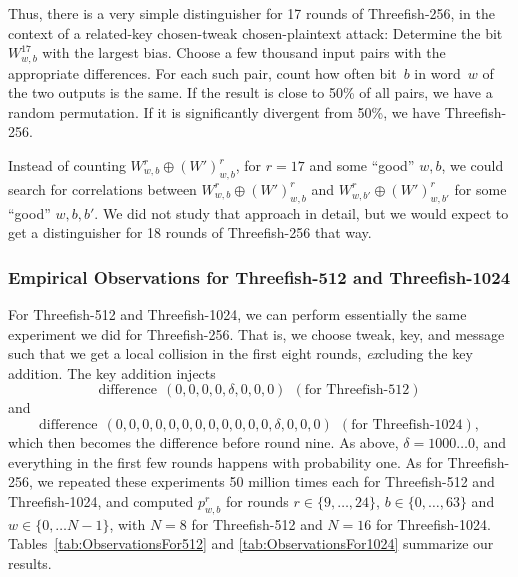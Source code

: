 \documentclass[11pt,twoside]{article}
\begin{document}
Thus, there is a very simple distinguisher for 17 rounds of Threefish-256, in the context of a related-key chosen-tweak chosen-plaintext attack: Determine the bit $W^{17}_{w,b}$ with the largest bias. Choose a few thousand input pairs with the appropriate differences. For each such pair, count how often bit~$b$ in word~$w$ of the two outputs is the same. If the result is close to 50\% of all pairs, we have a random permutation. If it is significantly divergent from 50\%, we have Threefish-256.  

Instead of counting $W^r_{w,b} \oplus (W')^r_{w,b}$, for $r=17$ and some ``good'' $w,b$, we could search for correlations between $W^r_{w,b} \oplus (W')^r_{w,b}$ and $W^r_{w,b'} \oplus (W')^r_{w,b'}$ for some ``good'' $w,b,b'$. We did not study that approach in detail, but we would expect to get a distinguisher for 18 rounds of Threefish-256 that way.

\subsubsection{Empirical Observations for Threefish-512 and Threefish-1024}
  \label{sec:empiric512}

For Threefish-512 and Threefish-1024, we can perform essentially the same experiment we did for Threefish-256. That is, we choose tweak, key, and message such that we get a local collision in the first eight rounds, \emph{ex}cluding the key addition. The key addition injects 
  \[ \mbox{difference} \ \ (0, 0, 0, 0, \delta, 0, 0, 0) \ \
         (\mbox{for Threefish-512}) \]
and
  \[ \mbox{difference} \ \
     (0,0,0,0,0,0,0,0,0,0,0,0, \delta, 0, 0, 0)
     \ \ (\mbox{for Threefish-1024}),
  \]
which then becomes the difference before round nine. As above, $\delta=1000\ldots0$, and everything in the first few rounds happens with probability one. As for Threefish-256, we repeated these experiments 50 million times each for Threefish-512 and Threefish-1024, and computed $p^r_{w,b}$ for rounds $r \in \{9, \ldots, 24\}$, $b \in \{0, \ldots, 63\}$ and $w \in \{0, \ldots N-1\}$, with $N=8$ for Threefish-512 and $N=16$ for Threefish-1024. Tables~\ref{tab:ObservationsFor512} and \ref{tab:ObservationsFor1024} summarize our results. 
\end{document}
